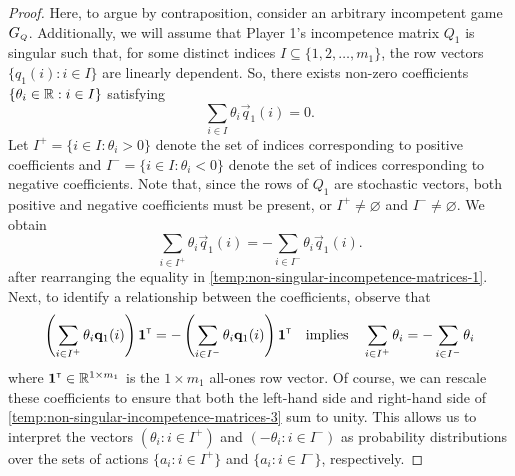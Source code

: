     \begin{proof}
        Here, to argue by contraposition, consider an arbitrary incompetent game $G_\ms{Q}$.
        Additionally, we will assume that Player 1's incompetence matrix $Q_1$ is singular such that, for some distinct indices $I \subseteq \{1, 2, \ldots, m_1\}$, the row vectors $\{q_1(i) : i \in I\}$ are linearly dependent.
        So, there exists non-zero coefficients $\{\theta_i \in \mathbb{R} : i \in I\}$ satisfying
        \begin{equation} \label{temp:non-singular-incompetence-matrices-1}
            \sum_{i \in I} \theta_i \vec{q}_1(i)
                = 0.
        \end{equation}
        Let $I^+ = \{i \in I : \theta_i > 0\}$ denote the set of indices corresponding to positive coefficients and $I^- = \{i \in I : \theta_i < 0\}$ denote the set of indices corresponding to negative coefficients.
        Note that, since the rows of $Q_1$ are stochastic vectors, both positive and negative coefficients must be present, or $I^+ \neq \varnothing$ and $I^- \neq \varnothing$.
        We obtain
        \begin{equation}  \label{temp:non-singular-incompetence-matrices-2}
            \sum_{i \in I^+} \theta_i \vec{q}_1(i)
                = - \sum_{i \in I^-} \theta_i \vec{q}_1(i).
        \end{equation}
        after rearranging the equality in \eqref{temp:non-singular-incompetence-matrices-1}.
        Next, to identify a relationship between the coefficients, observe that
        \begin{equation} \label{temp:non-singular-incompetence-matrices-3}
            \left( \sum_{i \in I^+} \theta_i \mathbf{q}_1(i) \right) \mathbf{1}^{\scriptscriptstyle \mathsf{T}}
                = - \left( \sum_{i \in I^-} \theta_i \mathbf{q}_1(i) \right) \mathbf{1}^{\scriptscriptstyle \mathsf{T}}
            \quad\text{implies}\quad
            \sum_{i \in I^+} \theta_i
                = - \sum_{i \in I^-} \theta_i
        \end{equation}
        where $\mathbf{1}^{\scriptscriptstyle \mathsf{T}} \in \mathbb{R}^{1 \times m_1}$ is the $1 \times m_1$ all-ones row vector.
        Of course, we can rescale these coefficients to ensure that both the left-hand side and right-hand side of \eqref{temp:non-singular-incompetence-matrices-3} sum to unity.
        This allows us to interpret the vectors $(\theta_i : i \in I^+)$ and $(-\theta_i : i \in I^-)$ as probability distributions over the sets of actions $\{a_i : i \in I^+\}$ and $\{a_i : i \in I^-\}$, respectively.


\end{proof}

